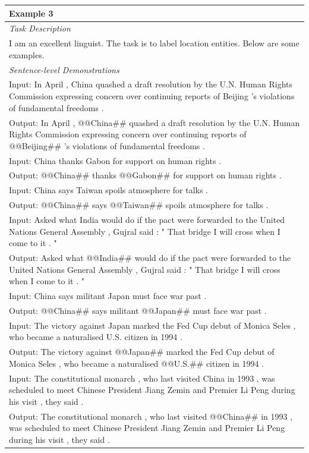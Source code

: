 \documentclass[11pt]{article}
\begin{document}
\begin{table}[th!]
{\begin{tabular}{l}
\textbf{Example 3} \\\midrule
       	\textit{Task Description} \\
I am an excellent linguist. The task is to label location entities. Below are some examples. \\\midrule
\textit{Sentence-level Demonstrations} \\
Input: In April , China quashed a draft resolution by the U.N. Human Rights Commission expressing concern over continuing reports of Beijing 's violations of fundamental freedoms . \\
Output: In April , @@China\#\# quashed a draft resolution by the U.N. Human Rights Commission expressing concern over continuing reports of @@Beijing\#\# 's violations of fundamental freedoms . \\
Input: China thanks Gabon for support on human rights . \\
Output: @@China\#\# thanks @@Gabon\#\# for support on human rights . \\
Input: China says Taiwan spoils atmosphere for talks . \\
Output: @@China\#\# says @@Taiwan\#\# spoils atmosphere for talks . \\
Input: Asked what India would do if the pact were forwarded to the United Nations General Assembly , Gujral said : " That bridge I will cross when I come to it . " \\
Output: Asked what @@India\#\# would do if the pact were forwarded to the United Nations General Assembly , Gujral said : " That bridge I will cross when I come to it . " \\
Input: China says militant Japan must face war past . \\
Output: @@China\#\# says militant @@Japan\#\# must face war past . \\
Input: The victory against Japan marked the Fed Cup debut of Monica Seles , who became a naturalised U.S. citizen in 1994 . \\
Output: The victory against @@Japan\#\# marked the Fed Cup debut of Monica Seles , who became a naturalised @@U.S.\#\# citizen in 1994 . \\
Input: The constitutional monarch , who last visited China in 1993 , was scheduled to meet Chinese President Jiang Zemin and Premier Li Peng during his visit , they said . \\
Output: The constitutional monarch , who last visited @@China\#\# in 1993 , was scheduled to meet Chinese President Jiang Zemin and Premier Li Peng during his visit , they said . \\

\end{tabular}}
\end{table}
\end{document}
